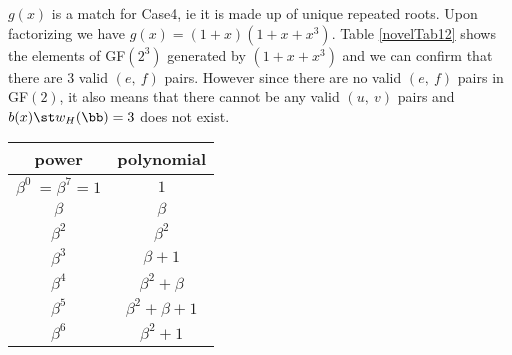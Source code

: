 \begin{example}
 $g(x)$ is a match for Case4, ie it is made up of unique repeated roots. Upon factorizing we have $g(x)=(1+x)(1+x+x^3)$. Table \ref{novelTab12} shows the elements of GF$(2^3)$ generated by $(1+x+x^3)$ and we can confirm that there are 3 valid $(e,~f)$ pairs. However since there are no valid $(e,~f)$ pairs in GF$(2)$, it also means that there cannot be any valid $(u,~v)$ pairs and $b(x) \st w_H(\bb)=3$ does not exist.
 
 \begin{table*}[h]
 \caption{Non-zero Elements of GF$(2^3)$ generated by $1+x+x^3$}
\centering
 \begin{tabular}{c c} 
 \hline
 power & polynomial \\ [0.5ex] 
 \hline\hline
$\beta^0~=\beta^{7}=1$ & $1$\\
\hline
$\beta$ & $\beta$\\
\hline
$\beta^2$ &  $\beta^2$\\
\hline
$\beta^3$ & $\beta+1$\\
\hline
$\beta^4$ &  $\beta^2+\beta$\\
\hline
$\beta^5$ & $\beta^2+\beta+1$\\
\hline
$\beta^6$ &  $\beta^2+1$\\
 \end{tabular}
 \label{novelTab12}
\end{table*}
\end{example}







